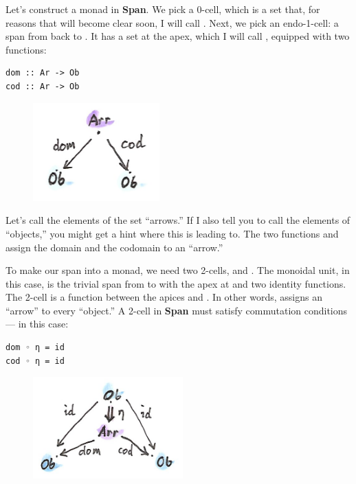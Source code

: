Let's construct a monad in \textbf{Span}. We pick a 0-cell, which is a
set that, for reasons that will become clear soon, I will call
. Next, we pick an endo-1-cell: a span from  back
to . It has a set at the apex, which I will call ,
equipped with two functions:

\begin{Verbatim}[commandchars=\\\{\}]
dom :: Ar -> Ob
cod :: Ar -> Ob
\end{Verbatim}

\begin{figure}[H]
\centering
\includegraphics[width=1.91667in]{images/spanmonad.png}
\end{figure}

\noindent
Let's call the elements of the set  ``arrows.'' If I also
tell you to call the elements of  ``objects,'' you might get
a hint where this is leading to. The two functions  and
 assign the domain and the codomain to an ``arrow.''

To make our span into a monad, we need two 2-cells,  and
. The monoidal unit, in this case, is the trivial span from
 to  with the apex at  and two identity
functions. The 2-cell  is a function between the apices
 and . In other words,  assigns an
``arrow'' to every ``object.'' A 2-cell in \textbf{Span} must satisfy
commutation conditions --- in this case:

\begin{Verbatim}[commandchars=\\\{\}]
dom ◦ η = id
cod ◦ η = id
\end{Verbatim}

\begin{figure}[H]
\centering
\includegraphics[width=2.27083in]{images/spanunit.png}
\end{figure}

